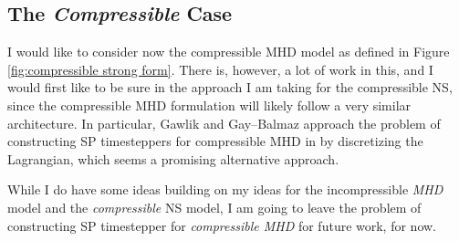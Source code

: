 \subsection*{The \emph{Compressible} Case}
    \begin{remark}
        I would like to consider now the compressible MHD model as defined in Figure \ref{fig:compressible strong form}. There is, however, a lot of work in this, and I would first like to be sure in the approach I am taking for the compressible NS, since the compressible MHD formulation will likely follow a very similar architecture. In particular, Gawlik and Gay--Balmaz approach the problem of constructing SP timesteppers for compressible MHD in \cite{Gawlik_Gay--Balmaz_2021,Gawlik_Gay--Balmaz_2022} by discretizing the Lagrangian, which seems a promising alternative approach.
        
        While I do have some ideas building on my ideas for the incompressible \emph{MHD} model and the \emph{compressible} NS model, I am going to leave the problem of constructing SP timestepper for \emph{compressible MHD} for future work, for now.
    \end{remark}
